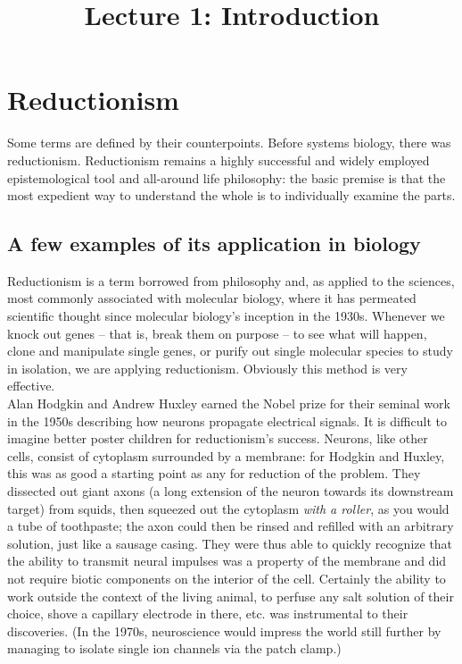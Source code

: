\documentclass{article}
\begin{document}
\large

\title{Lecture 1: Introduction}
\maketitle

\section*{Reductionism}

Some terms are defined by their counterpoints. Before systems biology, there was reductionism. Reductionism remains a highly successful and widely employed epistemological tool and all-around life philosophy: the basic premise is that the most expedient way to understand the whole is to individually examine the parts.


\subsection*{A few examples of its application in biology}
Reductionism is a term borrowed from philosophy and, as applied to the sciences, most commonly associated with molecular biology, where it has permeated scientific thought since molecular biology's inception in the 1930s. Whenever we knock out genes -- that is, break them on purpose -- to see what will happen, clone and manipulate single genes, or purify out single molecular species to study in isolation, we are applying reductionism. Obviously this method is very effective.\\

Alan Hodgkin and Andrew Huxley earned the Nobel prize for their seminal work in the 1950s describing how neurons propagate electrical signals. It is difficult to imagine better poster children for reductionism's success. Neurons, like other cells, consist of cytoplasm surrounded by a membrane: for Hodgkin and Huxley, this was as good a starting point as any for reduction of the problem. They dissected out giant axons (a long extension of the neuron towards its downstream target) from squids, then squeezed out the cytoplasm \textit{with a roller}, as you would a tube of toothpaste; the axon could then be rinsed and refilled with an arbitrary solution, just like a sausage casing. They were thus able to quickly recognize that the ability to transmit neural impulses was a property of the membrane and did not require biotic components on the interior of the cell. Certainly the ability to work outside the context of the living animal, to perfuse any salt solution of their choice, shove a capillary electrode in there, etc. was instrumental to their discoveries. (In the 1970s, neuroscience would impress the world still further by managing to isolate single ion channels via the patch clamp.)
\end{document}
